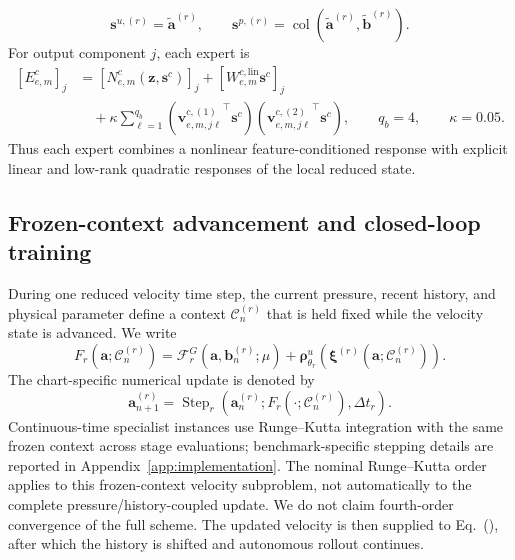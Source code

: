 \begin{equation}
  \bm s^{u,(r)}
  =
  \widetilde{\bm a}^{(r)},
  \qquad
  \bm s^{p,(r)}
  =
  \operatorname{col}
  \left(
    \widetilde{\bm a}^{(r)},
    \widetilde{\bm b}^{(r)}
  \right).
  \label{eq:app_expert_state_slices}
\end{equation}
For output component $j$, each expert is
\begin{align}
  \left[E_{e,m}^c\right]_j
  &=
  \left[
    N_{e,m}^c
    \left(
      \bm z,\bm s^c
    \right)
  \right]_j
  +
  \left[
    W_{e,m}^{c,\mathrm{lin}}
    \bm s^c
  \right]_j
  \nonumber\\
  &\quad+
  \kappa
  \sum_{\ell=1}^{q_b}
  \left(
    {\bm v_{e,m,j\ell}^{c,(1)}}^{\top}
    \bm s^c
  \right)
  \left(
    {\bm v_{e,m,j\ell}^{c,(2)}}^{\top}
    \bm s^c
  \right),
  \qquad
  q_b=4,
  \qquad
  \kappa=0.05.
  \label{eq:app_structured_expert}
\end{align}
Thus each expert combines a nonlinear feature-conditioned response with
explicit linear and low-rank quadratic responses of the local reduced state.


\subsection{Frozen-context advancement and closed-loop training}

During one reduced velocity time step, the current pressure, recent history, and
physical parameter define a context $\mathcal C_n^{(r)}$ that is held fixed
while the velocity state is advanced. We write
\begin{equation}
  F_r
  \left(
    \bm a;\mathcal C_n^{(r)}
  \right)
  =
  \mathcal F_r^G
  \left(
    \bm a,\bm b_n^{(r)};\mu
  \right)
  +
  \bm\rho^u_{\theta_r}
  \left(
    \bm\xi^{(r)}
    \left(
      \bm a;\mathcal C_n^{(r)}
    \right)
  \right).
  \label{eq:app_frozen_context_rhs}
\end{equation}
The chart-specific numerical update is denoted by
\begin{equation}
  \bm a_{n+1}^{(r)}
  =
  \operatorname{Step}_r
  \left(
    \bm a_n^{(r)};
    F_r(\cdot;\mathcal C_n^{(r)}),
    \Delta t_r
  \right).
  \label{eq:app_specialist_step}
\end{equation}
Continuous-time specialist instances use Runge--Kutta integration with the
same frozen context across stage evaluations; benchmark-specific stepping
details are reported in Appendix~\ref{app:implementation}.
The nominal Runge--Kutta order applies to this frozen-context velocity subproblem, not automatically to the complete pressure/history-coupled update. We do not claim fourth-order convergence of the full scheme.
The updated velocity is then supplied to
Eq.~(), after which the history is
shifted and autonomous rollout continues.

